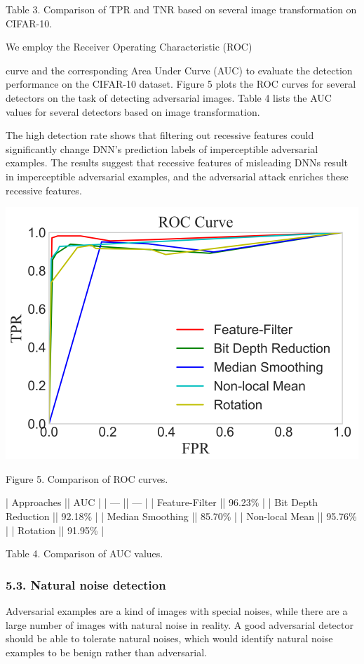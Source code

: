 \documentclass{article}
\begin{document}
Table 3. Comparison of TPR and TNR based on several image transformation on CIFAR-10.

We employ the Receiver Operating Characteristic (ROC)

curve and the corresponding Area Under Curve (AUC) to evaluate the detection performance on the CIFAR-10 dataset. Figure 5 plots the ROC curves for several detectors on the task of detecting adversarial images. Table 4 lists the AUC values for several detectors based on image transformation.

The high detection rate shows that filtering out recessive features could significantly change DNN's prediction labels of imperceptible adversarial examples. The results suggest that recessive features of misleading DNNs result in imperceptible adversarial examples, and the adversarial attack enriches these recessive features.


\includegraphics{_page_6_Figure_8.png}


Figure 5. Comparison of ROC curves.

| Approaches          || AUC    |
| ---                 || ---    |
| Feature-Filter      || 96.23\% |
| Bit Depth Reduction || 92.18\% |
| Median Smoothing    || 85.70\% |
| Non-local Mean      || 95.76\% |
| Rotation            || 91.95\% |

Table 4. Comparison of AUC values.

\subsubsection{5.3. Natural noise detection}

Adversarial examples are a kind of images with special noises, while there are a large number of images with natural noise in reality. A good adversarial detector should be able to tolerate natural noises, which would identify natural noise examples to be benign rather than adversarial.
\end{document}
